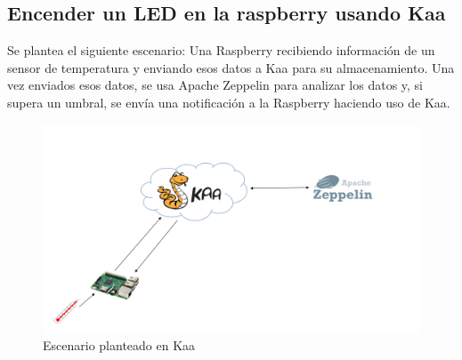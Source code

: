 \documentclass[12pt, twoside]{book}
\begin{document}
\subsection{Encender un LED en la raspberry usando Kaa}
Se plantea el siguiente escenario: Una Raspberry recibiendo información de un sensor de temperatura y enviando esos datos a Kaa para su almacenamiento. Una vez enviados esos datos, se usa Apache Zeppelin para analizar los datos y, si supera un umbral, se envía una notificación a la Raspberry haciendo uso de Kaa.
\begin{figure}[H]
\centering
\includegraphics[scale=0.5]{images/raspberry_example}
\caption{Escenario planteado en Kaa}\label{L508}
\end{figure}
\end{document}
